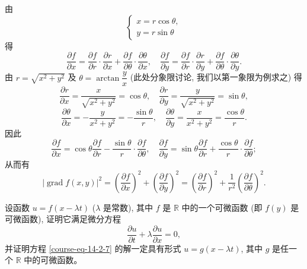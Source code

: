 \documentclass[UTF8,12pt,a4paper,fontset=fandol]{ctexart}
\begin{document}
\begin{solve}\quad 由
\[
  \begin{cases}
    x=r\cos\theta,\\
    y=r\sin\theta
  \end{cases}
\]
得
\[
  \frac{\partial f}{\partial x}
  =\frac{\partial f}{\partial r}\cdot\frac{\partial r}{\partial x}
  +\frac{\partial f}{\partial\theta}\cdot\frac{\partial\theta}{\partial x},
  \quad
  \frac{\partial f}{\partial y}
  =\frac{\partial f}{\partial r}\cdot\frac{\partial r}{\partial y}
  +\frac{\partial f}{\partial\theta}\cdot\frac{\partial\theta}{\partial y}.
\]
由 $r=\sqrt{x^2+y^2}$ 及 $\theta=\arctan\dfrac yx$ (此处分象限讨论, 我们以第一象限为例求之) 得
\[
  \frac{\partial r}{\partial x}=\frac{x}{\sqrt{x^2+y^2}}=\cos\theta,\quad
  \frac{\partial r}{\partial y}=\frac{y}{\sqrt{x^2+y^2}}=\sin\theta,
\]
\[
  \frac{\partial\theta}{\partial x}=-\frac{y}{x^2+y^2}=-\frac{\sin\theta}{r},\quad
  \frac{\partial\theta}{\partial y}=\frac{x}{x^2+y^2}=\frac{\cos\theta}{r}.
\]
因此
\[
  \frac{\partial f}{\partial x}
  =\cos\theta\frac{\partial f}{\partial r}
  -\frac{\sin\theta}{r}\cdot\frac{\partial f}{\partial\theta},
  \quad
  \frac{\partial f}{\partial y}
  =\sin\theta\frac{\partial f}{\partial r}
  +\frac{\cos\theta}{r}\cdot\frac{\partial f}{\partial\theta};
\]
从而有
\[
  |\operatorname{grad}f(x,y)|^2
  =
  \left(\frac{\partial f}{\partial x}\right)^2+
  \left(\frac{\partial f}{\partial y}\right)^2
  =
  \left(\frac{\partial f}{\partial r}\right)^2+
  \frac1{r^2}\left(\frac{\partial f}{\partial\theta}\right)^2.
\]

\end{solve}
\begin{example}\label{course-example-14-2-6}\quad 设函数 $u=f(x-\lambda t)$ ($\lambda$ 是常数), 其中 $f$ 是 $\mathbb R$ 中的一个可微函数 (即 $f(y)$ 是可微函数), 证明它满足微分方程
\begin{equation}
  \frac{\partial u}{\partial t}+\lambda\frac{\partial u}{\partial x}=0,
\label{course-eq-14-2-7}
\end{equation}
并证明方程 \eqref{course-eq-14-2-7}  的解一定具有形式 $u=g(x-\lambda t)$, 其中 $g$ 是任一个 $\mathbb R$ 中的可微函数。

\end{example}
\end{document}
